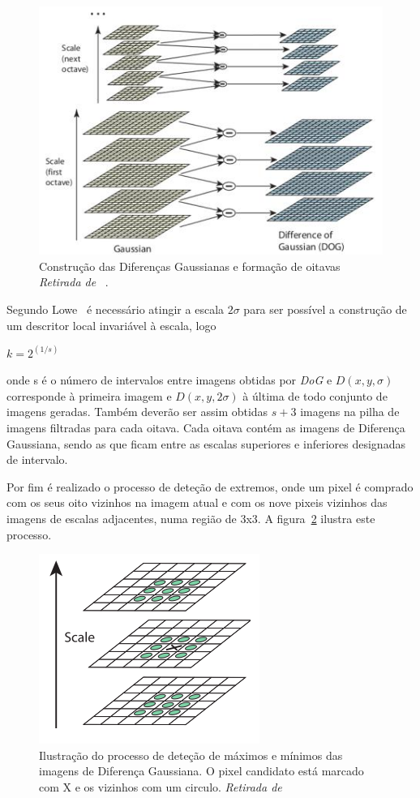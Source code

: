 \begin{enumerate}
\begin{figure}[h]
\centering
\includegraphics[width=0.7\linewidth]{./figures/sift_dog.jpg}
\caption{ Construção das Diferenças Gaussianas e formação de oitavas \textit{Retirada de}~\cite{Lowe2004} .}
\label{fig:siftdog}
\end{figure}

Segundo Lowe~\cite{Lowe2004}  é necessário atingir a escala $ 2\sigma $ para ser possível a construção de um descritor local invariável à escala, logo

$ k = 2^{\left(1/s \right)} $

onde s é o número de intervalos entre imagens obtidas por \textit{DoG} e $ D(x, y, \sigma) $ corresponde à primeira imagem e $ D(x, y, 2\sigma) $ à última de todo conjunto de imagens geradas. Também deverão ser assim obtidas $s + 3$ imagens na pilha de imagens filtradas para cada oitava. Cada oitava contém as imagens de Diferença Gaussiana, sendo as que ficam entre as escalas superiores e inferiores designadas de intervalo. 

Por fim é realizado o processo de deteção de extremos, onde um pixel é comprado com os seus oito vizinhos na imagem atual e com os nove pixeis vizinhos das imagens de escalas adjacentes, numa região de 3x3. A figura~\ref{fig:siftdog2} ilustra este processo.  

\begin{figure}[h]
\centering
\includegraphics[width=0.4\linewidth]{./figures/sift_dog2.png}
\caption{Ilustração do processo de deteção de máximos e mínimos das imagens de Diferença Gaussiana. O pixel candidato está marcado com X e os vizinhos com um circulo. \textit{Retirada de}~\cite{Lowe2004}}
\label{fig:siftdog2}
\end{figure}


\end{enumerate}
